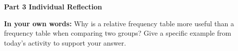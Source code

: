 \documentclass[10pt]{article}
\begin{document}
\vspace{0.14in}

{\large\bfseries\color{navy} Part 3 \quad Individual Reflection}

\vspace{0.1in}

\begin{tcolorbox}[colback=goldbg, colframe=goldacc, boxrule=0.8pt, arc=2mm,
    left=3mm, right=3mm, top=2mm, bottom=2mm]
\small\textbf{In your own words:} Why is a relative frequency table more useful than
a frequency table when comparing two groups? Give a specific example from today's
activity to support your answer.\\[6pt]
\writeline\\[1pt]\writeline\\[1pt]\writeline
\end{tcolorbox}
\end{document}
